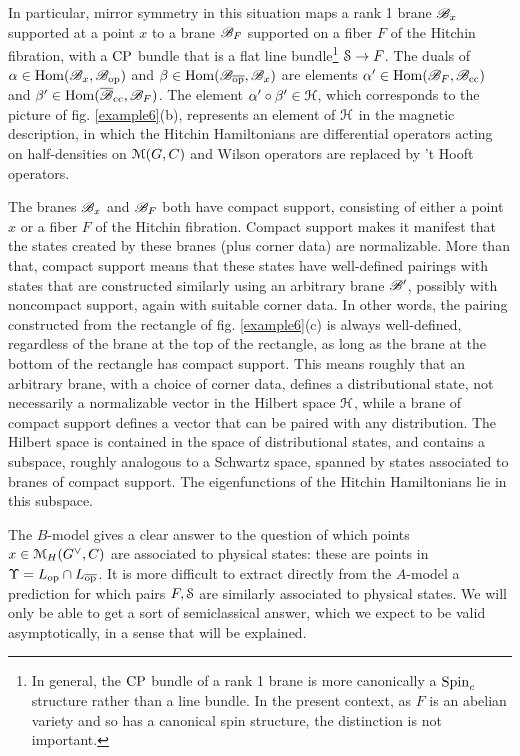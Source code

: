 \documentclass[11pt,a4paper]{article}
\begin{document}
In particular, mirror symmetry in this situation maps a rank 1 brane $\B_x$ supported at a point $x$ to a brane $\B_F$ supported on a fiber $F$ of the
Hitchin fibration, with a $\CP$ bundle that is a flat line bundle\footnote{\label{canon} In general, the $\CP$ bundle of a rank 1 brane is more canonically a $\Spinc$
structure rather than a line bundle.   In the present context, as $F$ is an abelian variety and so has a canonical spin structure, the distinction is  not important.}
$\S\to F$.  The duals of $\alpha\in \Hom(\B_x,\B_\op)$ and $\beta\in\Hom(\B_\bop,\B_x)$ are elements $\alpha'\in \Hom(\B_F,\B_\cc)$ and $\beta'\in \Hom(
\b\B_\cc,\B_F)$.   The element $\alpha'\circ\beta'\in \H$, which corresponds to the picture of fig. \ref{example6}(b), represents an element of $\H$ in the magnetic
description, in which the Hitchin Hamiltonians are differential operators acting on half-densities on $\M(G,C)$ and Wilson operators are replaced by
't Hooft operators.   

The branes $\B_x$ and $\B_F$ both have compact support, consisting of either a point $x$ or a fiber $F$ of the Hitchin fibration.      Compact support
makes it manifest that the states created by these branes (plus corner data)  are normalizable.   More than that,  compact support
means that these states have well-defined pairings with states that are constructed similarly using  an arbitrary brane $\B'$, possibly
with noncompact support, again with suitable corner data.   In other words, the pairing constructed from the rectangle of fig. \ref{example6}(c) is always
well-defined, regardless of the brane at the top of the rectangle, as long as the brane at the bottom of the rectangle has compact support.   This means roughly that an arbitrary brane, with a choice of corner data,   defines a distributional state, not
necessarily a normalizable vector in the Hilbert space $\H$,
 while a brane of compact support defines a vector  that can be paired with any distribution.  
 The Hilbert space is contained in the space of distributional states, and contains a subspace, roughly analogous to a Schwartz space, spanned by states
 associated to branes of compact support.
The eigenfunctions of the Hitchin Hamiltonians lie in this subspace.

The $B$-model gives a clear answer to the question of which  points $x\in \M_H(G^\vee,C)$ are associated to physical states: these are points in 
$\Upsilon=L_\op\cap L_\bop$.   
It is more difficult to extract directly from the $A$-model a prediction
for which pairs $F,\S$ are similarly associated to physical states.   We will only be able to get a sort of semiclassical answer, which we expect to be valid
asymptotically, in a sense that will be explained.  
\end{document}
